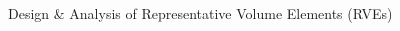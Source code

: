 \documentclass[final]{beamer}
\begin{document}
\begin{frame}
\begin{center}
\begin{minipage}{\textwidth}
\begin{exampleblock}{\rule[-0.6ex]{0pt}{50pt}\centering\LARGE Design \& Analysis of Representative Volume Elements (RVEs)}
\begin{columns}
\begin{column}{0.3\textwidth}
\end{column}
\begin{column}{0.15\textwidth}  %
    \begin{center}
\captionsetup[subfigure]{labelformat=empty}
\begin{figure}[!h]
\centering
{}
\end{figure}
     \end{center}
\end{column}
\begin{column}{0.125\textwidth}

\end{column}
\end{columns}
\end{exampleblock}
\end{minipage}
\end{center}
\end{frame}
\end{document}
